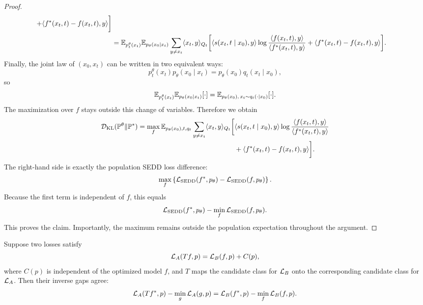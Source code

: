 \begin{proof}
\[\begin{aligned}
  +
  \langle f^*(x_t,t)-f(x_t,t),y\rangle
\biggr]
\\
&=
\mathbb{E}_{p_t^\theta(x_t)}
\mathbb{E}_{p_\theta(x_0\mid x_t)}
\sum_{y\neq x_t}
\langle x_t,y\rangle_{Q_t}
\biggl[
  \langle s(x_t,t\mid x_0),y\rangle
  \log
  \frac{\langle f(x_t,t),y\rangle}
       {\langle f^*(x_t,t),y\rangle}
  +
  \langle f^*(x_t,t)-f(x_t,t),y\rangle
\biggr].
\end{aligned}
\]
Finally, the joint law of \((x_0,x_t)\) can be written in two equivalent ways:
\[
    p_t^\theta(x_t)p_\theta(x_0\mid x_t)
    =
    p_\theta(x_0)q_t(x_t\mid x_0),
\]
so
\[
    \mathbb{E}_{p_t^\theta(x_t)}
    \mathbb{E}_{p_\theta(x_0\mid x_t)}[\cdot]
    =
    \mathbb{E}_{p_\theta(x_0),\,x_t\sim q_t(\cdot\mid x_0)}[\cdot].
\]
The maximization over \(f\) stays outside this change of variables. Therefore
we obtain
\begin{equation}
\label{eq:sedd-population-recognition}
\begin{aligned}
    \mathcal{D}_{\mathrm{KL}}(\mathbb{P}^\theta\|\mathbb{P}^*)
    =
    \max_f
    \mathbb{E}_{p_\theta(x_0),t,q_t}
    \sum_{y\neq x_t}
    \langle x_t,y\rangle_{Q_t}
    \biggl[
      &\langle s(x_t,t\mid x_0),y\rangle
      \log
      \frac{\langle f(x_t,t),y\rangle}
           {\langle f^*(x_t,t),y\rangle}
      \\
      &+
      \langle f^*(x_t,t)-f(x_t,t),y\rangle
    \biggr].
\end{aligned}
\end{equation}
The right-hand side is exactly the population SEDD loss difference:
\[
    \max_f
    \left\{
      \mathcal{L}_{\mathrm{SEDD}}(f^*,p_\theta)
      -
      \mathcal{L}_{\mathrm{SEDD}}(f,p_\theta)
    \right\}.
\]
Because the first term is independent of \(f\), this equals
\[
    \mathcal{L}_{\mathrm{SEDD}}(f^*,p_\theta)
    -
    \min_f \mathcal{L}_{\mathrm{SEDD}}(f,p_\theta).
\]
This proves the claim. Importantly, the maximum remains outside the population
expectation throughout the argument.
\end{proof}

\begin{lemma}
\label{lem:gap-preservation}
Suppose two losses satisfy
\[
    \mathcal{L}_A(Tf,p)=\mathcal{L}_B(f,p)+C(p),
\]
where \(C(p)\) is independent of the optimized model \(f\), and \(T\) maps the
candidate class for \(\mathcal{L}_B\) onto the corresponding candidate class for
\(\mathcal{L}_A\). Then their inverse gaps agree:
\[
    \mathcal{L}_A(Tf^*,p)-\min_g \mathcal{L}_A(g,p)
    =
    \mathcal{L}_B(f^*,p)-\min_f \mathcal{L}_B(f,p).
\]
\end{lemma}

